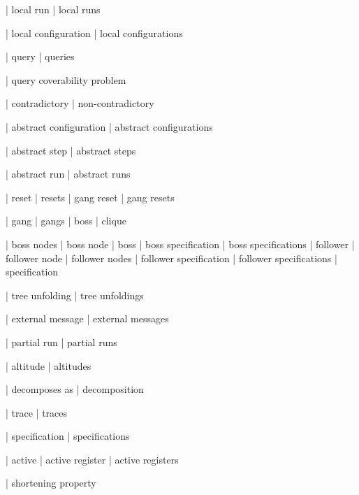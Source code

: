| local run
| local runs

| local configuration
| local configurations

| query
| queries

| query coverability problem

| contradictory
| non-contradictory

| abstract configuration
| abstract configurations

| abstract step
| abstract steps


| abstract run
| abstract runs

| reset
| resets
| gang reset
| gang resets



| gang
| gangs
| boss
| clique


| boss nodes
| boss node
| boss
| boss specification
| boss specifications
| follower
| follower node
| follower nodes
| follower specification
| follower specifications
| specification

| tree unfolding
| tree unfoldings

| external message
| external messages

| partial run
| partial runs

| altitude
| altitudes

| decomposes as
| decomposition

| trace
| traces

| specification
| specifications


| active
| active register
| active registers

| shortening property
